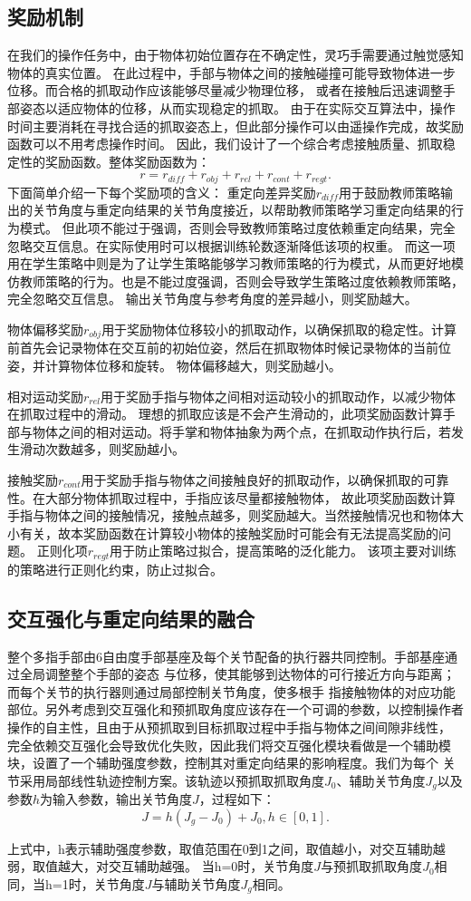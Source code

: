 \subsection{奖励机制}
在我们的操作任务中，由于物体初始位置存在不确定性，灵巧手需要通过触觉感知物体的真实位置。
在此过程中，手部与物体之间的接触碰撞可能导致物体进一步位移。而合格的抓取动作应该能够尽量减少物理位移，
或者在接触后迅速调整手部姿态以适应物体的位移，从而实现稳定的抓取。
由于在实际交互算法中，操作时间主要消耗在寻找合适的抓取姿态上，但此部分操作可以由遥操作完成，故奖励函数可以不用考虑操作时间。
因此，我们设计了一个综合考虑接触质量、抓取稳定性的奖励函数。整体奖励函数为：
\begin{equation}
r = r_{diff} + r_{obj} + r_{rel} + r_{cont} + r_{regt}.
\end{equation}
下面简单介绍一下每个奖励项的含义：
重定向差异奖励$r_{diff}$用于鼓励教师策略输出的关节角度与重定向结果的关节角度接近，以帮助教师策略学习重定向结果的行为模式。
但此项不能过于强调，否则会导致教师策略过度依赖重定向结果，完全忽略交互信息。在实际使用时可以根据训练轮数逐渐降低该项的权重。
而这一项用在学生策略中则是为了让学生策略能够学习教师策略的行为模式，从而更好地模仿教师策略的行为。也是不能过度强调，否则会导致学生策略过度依赖教师策略，完全忽略交互信息。
输出关节角度与参考角度的差异越小，则奖励越大。

物体偏移奖励$r_{obj}$用于奖励物体位移较小的抓取动作，以确保抓取的稳定性。计算前首先会记录物体在交互前的初始位姿，然后在抓取物体时候记录物体的当前位姿，并计算物体位移和旋转。
物体偏移越大，则奖励越小。

相对运动奖励$r_{rel}$用于奖励手指与物体之间相对运动较小的抓取动作，以减少物体在抓取过程中的滑动。
理想的抓取应该是不会产生滑动的，此项奖励函数计算手部与物体之间的相对运动。将手掌和物体抽象为两个点，在抓取动作执行后，若发生滑动次数越多，则奖励越小。

接触奖励$r_{cont}$用于奖励手指与物体之间接触良好的抓取动作，以确保抓取的可靠性。在大部分物体抓取过程中，手指应该尽量都接触物体，
故此项奖励函数计算手指与物体之间的接触情况，接触点越多，则奖励越大。当然接触情况也和物体大小有关，故本奖励函数在计算较小物体的接触奖励时可能会有无法提高奖励的问题。
正则化项$r_{regt}$用于防止策略过拟合，提高策略的泛化能力。
该项主要对训练的策略进行正则化约束，防止过拟合。

\subsection{交互强化与重定向结果的融合}
整个多指手部由6自由度手部基座及每个关节配备的执行器共同控制。手部基座通过全局调整整个手部的姿态
与位移，使其能够到达物体的可行接近方向与距离；而每个关节的执行器则通过局部控制关节角度，使多根手
指接触物体的对应功能部位。另外考虑到交互强化和预抓取角度应该存在一个可调的参数，以控制操作者操作的自主性，且由于从预抓取到目标抓取过程中手指与物体之间间隙非线性，
完全依赖交互强化会导致优化失败，因此我们将交互强化模块看做是一个辅助模块，设置了一个辅助强度参数，控制其对重定向结果的影响程度。我们为每个
关节采用局部线性轨迹控制方案。该轨迹以预抓取抓取角度$J_0$、辅助关节角度$J_g$以及参数$h$为输入参数，输出关节角度$J$，过程如下：
$$J = h(J_g - J_0) + J_0, h \in [0, 1].$$

上式中，h表示辅助强度参数，取值范围在0到1之间，取值越小，对交互辅助越弱，取值越大，对交互辅助越强。
当h=0时，关节角度$J$与预抓取抓取角度$J_0$相同，当h=1时，关节角度$J$与辅助关节角度$J_g$相同。